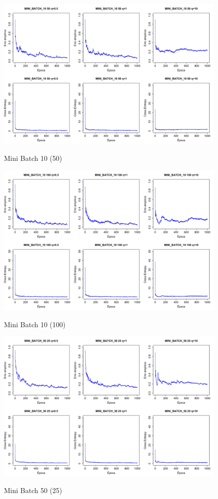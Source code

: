 \documentclass{report}
\begin{document}
\begin{figure}
  \includegraphics[width=\linewidth]{mini_batch_10_50.png}
  \label{fig:mini_batch_10_50}
  \caption{Mini Batch 10 (50)}
\end{figure}

\begin{figure}
  \includegraphics[width=\linewidth]{mini_batch_10_100.png}
  \label{fig:mini_batch_10_100}
  \caption{Mini Batch 10 (100)}
\end{figure}

\begin{figure}
  \includegraphics[width=\linewidth]{mini_batch_50_25.png}
  \label{fig:mini_batch_50_25}
  \caption{Mini Batch 50 (25)}
\end{figure}
\end{document}

